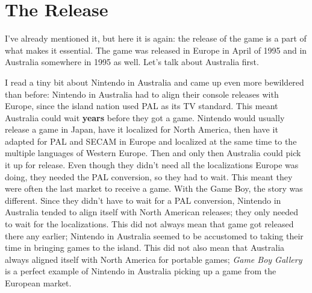 \documentclass{book}
\begin{document}
\FloatBarrier\needspace{10mm}\section*{The Release}\nopagebreak[4]

I’ve already mentioned it, but here it is again: the release of the game is a part of what makes it essential. The game was released in Europe in April of 1995 and in Australia somewhere in 1995 as well. Let’s talk about Australia first.

I read a tiny bit about Nintendo in Australia and came up even more bewildered than before: Nintendo in Australia had to align their console releases with Europe, since the island nation used PAL as its TV standard. This meant Australia could wait \textbf{years} before they got a game. Nintendo would usually release a game in Japan, have it localized for North America, then have it adapted for PAL and SECAM in Europe and localized at the same time to the multiple languages of Western Europe. Then and only then Australia could pick it up for release. Even though they didn’t need all the localizations Europe was doing, they needed the PAL conversion, so they had to wait. This meant they were often the last market to receive a game. With the Game Boy, the story was different. Since they didn’t have to wait for a PAL conversion, Nintendo in Australia tended to align itself with North American releases; they only needed to wait for the localizations. This did not always mean that game got released there any earlier; Nintendo in Australia seemed to be accustomed to taking their time in bringing games to the island. This did not also mean that Australia always aligned itself with North America for portable games; \emph{Game Boy Gallery} is a perfect example of Nintendo in Australia picking up a game from the European market.
\end{document}
